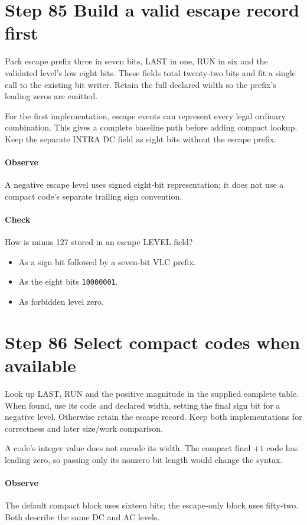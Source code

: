 \section{Step 85 Build a valid escape record first}\label{h263-coeff-s05}
Pack escape prefix three in seven bits, LAST in one, RUN in six and the validated
level's low eight bits. These fields total twenty-two bits and fit a single call
to the existing bit writer. Retain the full declared width so the prefix's leading
zeros are emitted.

For the first implementation, escape events can represent every legal ordinary
combination. This gives a complete baseline path before adding compact lookup.
Keep the separate INTRA DC field as eight bits without the escape prefix.

\paragraph{Observe} A negative escape level uses signed eight-bit representation;
it does not use a compact code's separate trailing sign convention.
\paragraph{Check} How is minus 127 stored in an escape LEVEL field?
\begin{itemize}
  \item[A.] As a sign bit followed by a seven-bit VLC prefix.
  \item[B.] As the eight bits \texttt{10000001}.
  \item[C.] As forbidden level zero.
\end{itemize}

\section{Step 86 Select compact codes when available}\label{h263-coeff-s06}
Look up LAST, RUN and the positive magnitude in the supplied complete table.
When found, use its code and declared width, setting the final sign bit for a
negative level. Otherwise retain the escape record. Keep both implementations
for correctness and later size/work comparison.

A code's integer value does not encode its width. The compact final $+1$ code
has leading zero, so passing only its nonzero bit length would change the syntax.

\paragraph{Observe} The default compact block uses sixteen bits; the escape-only
block uses fifty-two. Both describe the same DC and AC levels.
